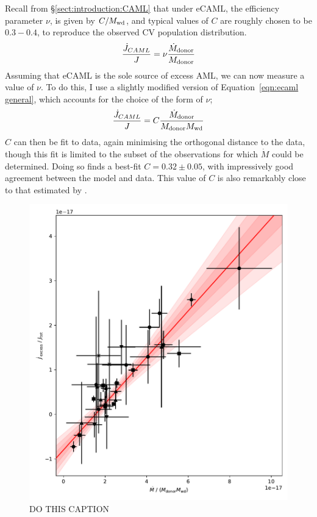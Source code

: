 Recall from \S\ref{sect:introduction:CAML} that under eCAML, the efficiency parameter $\nu$, is given by $C/M_{\rm wd}$, and typical values of $C$ are roughly chosen to be $0.3 - 0.4$, to reproduce the observed CV population distribution.
\begin{equation}
    \label{eqn:ecaml general}
    \frac{\dot J_{CAML}}{J} = \nu \frac{\dot M_{\rm donor}}{M_{\rm donor}}
\end{equation}
Assuming that eCAML is the sole source of excess AML, we can now measure a value of $\nu$. To do this, I use a slightly modified version of Equation~\ref{eqn:ecaml general}, which accounts for the choice of the form of $\nu$;
\begin{equation}
    \frac{\dot J_{CAML}}{J} = C \frac{\dot M_{\rm donor}}{M_{\rm donor} M_{\rm wd}}
\end{equation}
$C$ can then be fit to data, again minimising the orthogonal distance to the data, though this fit is limited to the subset of the observations for which $\dot M$ could be determined.
Doing so finds a best-fit $C = 0.32 \pm0.05$, with impressively good agreement between the model and data. This value of $C$ is also remarkably close to that estimated by \citet{Schreiber2016}. 
\begin{figure}
    \centering
    \includegraphics[width=\textwidth]{figures/results/Mdot/eCAML_nu_grey_large_error_fit.pdf}
    \caption{DO THIS CAPTION}
    \label{fig:discussion:calibrating ecaml relationship}
\end{figure}

